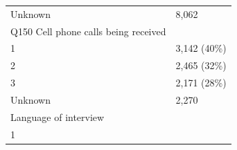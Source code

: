\documentclass[]{article}
\begin{document}
\begin{longtable}[]{@{}ll@{}}
\begin{minipage}[t]{0.71\columnwidth}\raggedright
Unknown\strut
\end{minipage} & \begin{minipage}[t]{0.23\columnwidth}\raggedright
8,062\strut
\end{minipage}\tabularnewline
\begin{minipage}[t]{0.71\columnwidth}\raggedright
Q150 Cell phone calls being received\strut
\end{minipage} & \begin{minipage}[t]{0.23\columnwidth}\raggedright
\strut
\end{minipage}\tabularnewline
\begin{minipage}[t]{0.71\columnwidth}\raggedright
1\strut
\end{minipage} & \begin{minipage}[t]{0.23\columnwidth}\raggedright
3,142 (40\%)\strut
\end{minipage}\tabularnewline
\begin{minipage}[t]{0.71\columnwidth}\raggedright
2\strut
\end{minipage} & \begin{minipage}[t]{0.23\columnwidth}\raggedright
2,465 (32\%)\strut
\end{minipage}\tabularnewline
\begin{minipage}[t]{0.71\columnwidth}\raggedright
3\strut
\end{minipage} & \begin{minipage}[t]{0.23\columnwidth}\raggedright
2,171 (28\%)\strut
\end{minipage}\tabularnewline
\begin{minipage}[t]{0.71\columnwidth}\raggedright
Unknown\strut
\end{minipage} & \begin{minipage}[t]{0.23\columnwidth}\raggedright
2,270\strut
\end{minipage}\tabularnewline
\begin{minipage}[t]{0.71\columnwidth}\raggedright
Language of interview\strut
\end{minipage} & \begin{minipage}[t]{0.23\columnwidth}\raggedright
\strut
\end{minipage}\tabularnewline
\begin{minipage}[t]{0.71\columnwidth}\raggedright
1\strut
\end{minipage} & \begin{minipage}[t]{0.23\columnwidth}\raggedright

\end{minipage}
\end{longtable}
\end{document}

